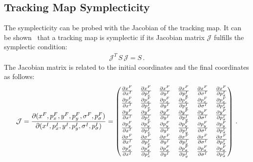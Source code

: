 



\begin{appendices}
\chapter{}




\section{Tracking Map Symplecticity} \label{chap:sympl}
The symplecticity can be probed with the Jacobian of the tracking map. It can be shown~\cite{CERN-SL-95-12} that a tracking map is symplectic if its Jacobian matrix $\mathcal{J}$ fulfills the symplectic condition:
%
\begin{align}
  \mathcal{J}^T \, S \, \mathcal{J} = S \, .
\end{align}
The Jacobian matrix is related to the initial coordinates and the final coordinates as follows:
%
\begin{align}
  \mathcal{J} = \PD{(x^F,p_x^F,y^F,p_y^F,\sigma^F,p_\sigma^F)}{(x^I,p_x^I,y^I,p_y^I,\sigma^I,p_\sigma^I)}  = %
\begin{pmatrix} 
\PD{x^F}{x^I} &
\PD{x^F}{p_x^I} &
\PD{x^F}{y^I} &
\PD{x^F}{p_y^I} &
\PD{x^F}{\sigma^I} &
\PD{x^F}{p_\sigma^I} \\
\PD{p_x^F}{x^I} &
\PD{p_x^F}{p_x^I} &
\PD{p_x^F}{y^I} &
\PD{p_x^F}{p_y^I} &
\PD{p_x^F}{\sigma^I} &
\PD{p_x^F}{p_\sigma^I} \\
\PD{y^F}{x^I} &
\PD{y^F}{p_x^I} &
\PD{y^F}{y^I} &
\PD{y^F}{p_y^I} &
\PD{y^F}{\sigma^I} &
\PD{y^F}{p_\sigma^I} \\
\PD{p_y^F}{x^I} &
\PD{p_y^F}{p_x^I} &
\PD{p_y^F}{y^I} &
\PD{p_y^F}{p_y^I} &
\PD{p_y^F}{\sigma^I} &
\PD{p_y^F}{p_\sigma^I} \\
\PD{\sigma^F}{x^I} &
\PD{\sigma^F}{p_x^I} &
\PD{\sigma^F}{y^I} &
\PD{\sigma^F}{p_y^I} &
\PD{\sigma^F}{\sigma^I} &
\PD{\sigma^F}{p_\sigma^I} \\
\PD{p_\sigma^F}{x^I} &
\PD{p_\sigma^F}{p_x^I} &
\PD{p_\sigma^F}{y^I} &
\PD{p_\sigma^F}{p_y^I} &
\PD{p_\sigma^F}{\sigma^I} &
\PD{p_\sigma^F}{p_\sigma^I} \\
\end{pmatrix} \, .
\end{align}



\end{appendices}
